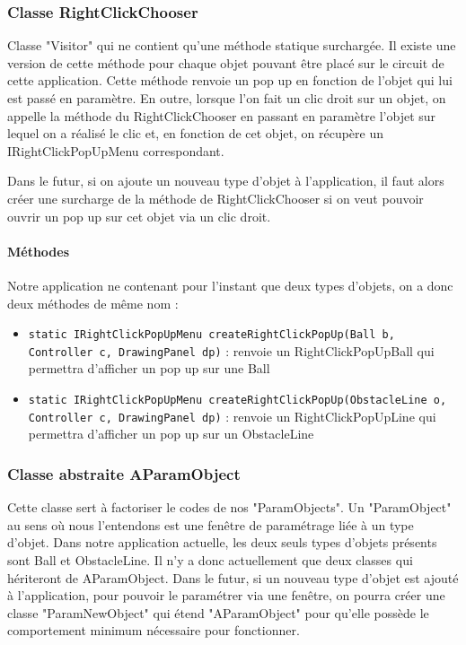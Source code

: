 \documentclass{report}
\begin{document}
\subsubsection{Classe RightClickChooser}

Classe "Visitor" qui ne contient qu'une méthode statique surchargée. Il existe une version de cette méthode pour chaque objet pouvant être placé sur le circuit de cette application. Cette méthode renvoie un pop up en fonction de l'objet qui lui est passé en paramètre. En outre, lorsque l'on fait un clic droit sur un objet, on appelle la méthode du RightClickChooser en passant en paramètre l'objet sur lequel on a réalisé le clic et, en fonction de cet objet, on récupère un IRightClickPopUpMenu correspondant.

Dans le futur, si on ajoute un nouveau type d'objet à l'application, il faut alors créer une surcharge de la méthode de RightClickChooser si on veut pouvoir ouvrir un pop up sur cet objet via un clic droit.

\paragraph*{Méthodes} Notre application ne contenant pour l'instant que deux types d'objets, on a donc deux méthodes de même nom :
\begin{itemize}
\item \texttt{static IRightClickPopUpMenu createRightClickPopUp(Ball b, Controller c, DrawingPanel dp)} : renvoie un RightClickPopUpBall qui permettra d'afficher un pop up sur une Ball
\item \texttt{static IRightClickPopUpMenu createRightClickPopUp(ObstacleLine o, Controller c, DrawingPanel dp)} : renvoie un RightClickPopUpLine qui permettra d'afficher un pop up sur un ObstacleLine
\end{itemize}

\subsubsection{Classe abstraite AParamObject}

Cette classe sert à factoriser le codes de nos "ParamObjects". Un "ParamObject" au sens où nous l'entendons est une fenêtre de paramétrage liée à un type d'objet. Dans notre application actuelle, les deux seuls types d'objets présents sont Ball et ObstacleLine. Il n'y a donc actuellement que deux classes qui hériteront de AParamObject. Dans le futur, si un nouveau type d'objet est ajouté à l'application, pour pouvoir le paramétrer via une fenêtre, on pourra créer une classe "ParamNewObject" qui étend "AParamObject" pour qu'elle possède le comportement minimum nécessaire pour fonctionner.
\end{document}
